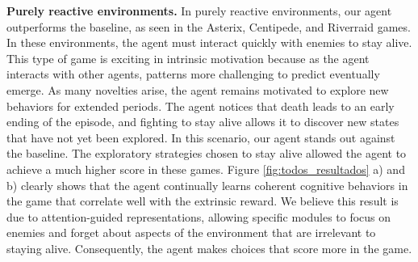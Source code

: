 \textbf{Purely reactive environments.} In purely reactive environments, our agent outperforms the baseline, as seen in the Asterix, Centipede, and Riverraid games. In these environments, the agent must interact quickly with enemies to stay alive. This type of game is exciting in intrinsic motivation because as the agent interacts with other agents, patterns more challenging to predict eventually emerge. As many novelties arise, the agent remains motivated to explore new behaviors for extended periods. The agent notices that death leads to an early ending of the episode, and fighting to stay alive allows it to discover new states that have not yet been explored. In this scenario, our agent stands out against the baseline. The exploratory strategies chosen to stay alive allowed the agent to achieve a much higher score in these games. Figure \ref{fig:todos_resultados} a) and b) clearly shows that the agent continually learns coherent cognitive behaviors in the game that correlate well with the extrinsic reward. We believe this result is due to attention-guided representations, allowing specific modules to focus on enemies and forget about aspects of the environment that are irrelevant to staying alive. Consequently, the agent makes choices that score more in the game.


\begin{figure*}[htb]%
    \centering
    \qquad
    \qquad
    \caption{Our proposed approach results. The training curve shows the best extrinsic returns per episode in the Asterix, Riverraid, and Atlantis environments. The x-axis represents the training steps, and the y-axis is the game score (i.e., accumulated extrinsic reward) received at the end of the episode. In these scenarios, our agent excels against the baseline (Table \ref{tab:tabela_resultados}). The exploratory strategies chosen to stay alive allowed the agent to obtain a much higher score in these games. After exploring states that led to bad scores, the agent quickly changes its exploratory strategy.}%
    \label{fig:todos_resultados}%
\end{figure*}




